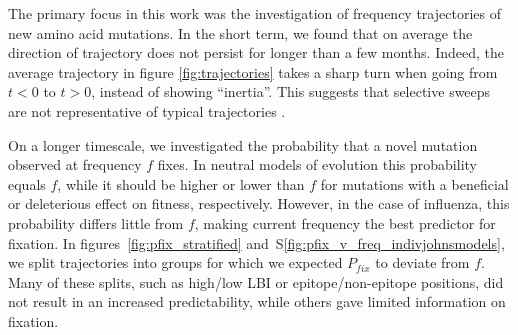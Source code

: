 \documentclass[reprint,amsmath,amssymb,superscriptaddress,showpacs,rmp]{revtex4-1}
\newcommand{\sref}[1]{S\ref{#1}}
\begin{document}
The primary focus in this work was the investigation of frequency trajectories of new amino acid mutations.
In the short term, we found that on average the direction of trajectory does not persist for longer than a few months.
Indeed, the average trajectory in figure \ref{fig:trajectories} takes a sharp turn when going from $t<0$ to $t>0$, instead of showing ``inertia''.
This suggests that selective sweeps are not representative of typical trajectories \citep{illingworth_components_2012}.

On a longer timescale, we investigated the probability that a novel mutation observed at frequency $f$ fixes.
In neutral models of evolution this probability equals $f$, while it should be higher or lower than $f$ for mutations with a beneficial or deleterious effect on fitness, respectively.
However, in the case of influenza, this probability differs little from $f$, making current frequency the best predictor for fixation.
In figures~\ref{fig:pfix_stratified} and~\sref{fig:pfix_v_freq_indivjohnsmodels}, we split trajectories into groups for which we expected $P_{fix}$ to deviate from $f$.
Many of these splits, such as high/low LBI or epitope/non-epitope positions, did not result in an increased predictability, while others gave limited information on fixation.

\end{document}
